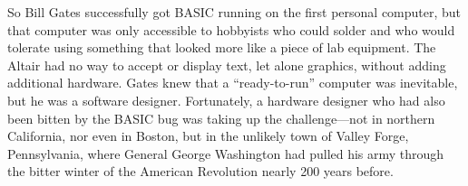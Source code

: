 So Bill Gates successfully got BASIC running on the first personal computer, but that computer was only
accessible to hobbyists who could solder and who would tolerate using
something that looked more like a piece of lab equipment.  The Altair had no way
to accept or display text, let alone graphics, without adding additional
hardware. 
Gates knew that a ``ready-to-run'' computer was inevitable, but he was a
software designer.  Fortunately, a hardware designer who had also been
bitten by the BASIC bug was taking up the challenge---not in northern
California, nor even in Boston, but in the unlikely town of Valley Forge,
Pennsylvania, where General George Washington had pulled his army
through the bitter winter of the American Revolution nearly 200 years before.


